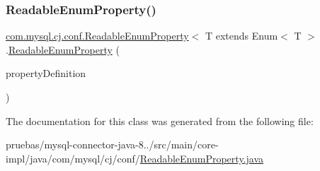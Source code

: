 \subsubsection{\texorpdfstring{Readable\+Enum\+Property()}{ReadableEnumProperty()}}
{\footnotesize\ttfamily \mbox{\hyperlink{classcom_1_1mysql_1_1cj_1_1conf_1_1_readable_enum_property}{com.\+mysql.\+cj.\+conf.\+Readable\+Enum\+Property}}$<$ T extends Enum$<$ T $>$.\mbox{\hyperlink{classcom_1_1mysql_1_1cj_1_1conf_1_1_readable_enum_property}{Readable\+Enum\+Property}} (\begin{DoxyParamCaption}\item[{\mbox{\hyperlink{interfacecom_1_1mysql_1_1cj_1_1conf_1_1_property_definition}{Property\+Definition}}$<$ T $>$}]{property\+Definition }\end{DoxyParamCaption})\hspace{0.3cm}{\ttfamily [protected]}}



The documentation for this class was generated from the following file\+:\begin{DoxyCompactItemize}
\item 
pruebas/mysql-\/connector-\/java-\/8../src/main/core-\/impl/java/com/mysql/cj/conf/\mbox{\hyperlink{_readable_enum_property_8java}{Readable\+Enum\+Property.\+java}}\end{DoxyCompactItemize}
